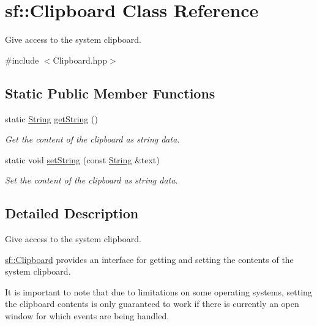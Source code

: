 \hypertarget{classsf_1_1_clipboard}{}\section{sf\+:\+:Clipboard Class Reference}
\label{classsf_1_1_clipboard}


Give access to the system clipboard.  




{\ttfamily \#include $<$Clipboard.\+hpp$>$}

\subsection*{Static Public Member Functions}
\begin{DoxyCompactItemize}
\item 
static \mbox{\hyperlink{classsf_1_1_string}{String}} \mbox{\hyperlink{classsf_1_1_clipboard_a3c385cc2b6d78a3d0cfa29928a7d6eb8}{get\+String}} ()
\begin{DoxyCompactList}\small\item\em Get the content of the clipboard as string data. \end{DoxyCompactList}\item 
static void \mbox{\hyperlink{classsf_1_1_clipboard_a29c597c2165d3ca3a89c17f31ff7413d}{set\+String}} (const \mbox{\hyperlink{classsf_1_1_string}{String}} \&text)
\begin{DoxyCompactList}\small\item\em Set the content of the clipboard as string data. \end{DoxyCompactList}\end{DoxyCompactItemize}


\subsection{Detailed Description}
Give access to the system clipboard. 

\begin{DoxyVerb}\end{DoxyVerb}


\mbox{\hyperlink{classsf_1_1_clipboard}{sf\+::\+Clipboard}} provides an interface for getting and setting the contents of the system clipboard.

It is important to note that due to limitations on some operating systems, setting the clipboard contents is only guaranteed to work if there is currently an open window for which events are being handled.

